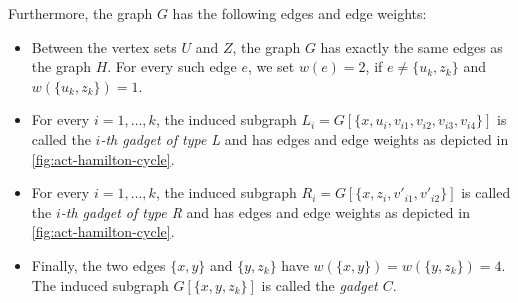 \documentclass[runningheads]{llncs}
\newcommand{\set}[1]{\{ #1 \}}
\newcommand{\lasse}[1]{#1}
\begin{document}
Furthermore, the graph $G$ has the following edges and edge weights:
\begin{itemize}
\item \lasse{Between the vertex sets $U$ and $Z$, the graph $G$ has exactly the same edges as the graph $H$. 
For every such edge $e$, we set} $w(e) = 2$, if $e \neq \set{u_k, z_k}$ and $w(\set{u_k, z_k}) = 1$.
\item For every $i = 1,\dots,k$, the induced subgraph $L_i = G[\set{x, u_i, v_{i1}, v_{i2}, v_{i3}, v_{i4}}]$ 
is called the \emph{$i$-th gadget of type L} and has edges and edge weights as depicted in \cref{fig:act-hamilton-cycle}.
\item For every $i = 1,\dots,k$, the induced subgraph $R_i = G[\set{x, z_i, v'_{i1}, v'_{i2}}]$ is called the 
\emph{$i$-th gadget of type R} and has edges and edge weights as depicted in \cref{fig:act-hamilton-cycle}.
\item Finally, the two edges $\set{x,y}$ and $\set{y, z_k}$ have $w(\set{x,y}) = w(\set{y, z_k}) = 4$. The induced subgraph $G[\set{x,y,z_k}]$ is called the \emph{gadget $C$}.
\end{itemize}
\end{document}
